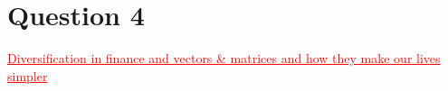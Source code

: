 \documentclass[12pt]{report}
\begin{document}

\newpage
\section*{Question 4}
\textcolor{red}{\underline{Diversification in finance and vectors \& matrices and how they make our lives simpler}}
\end{document}

